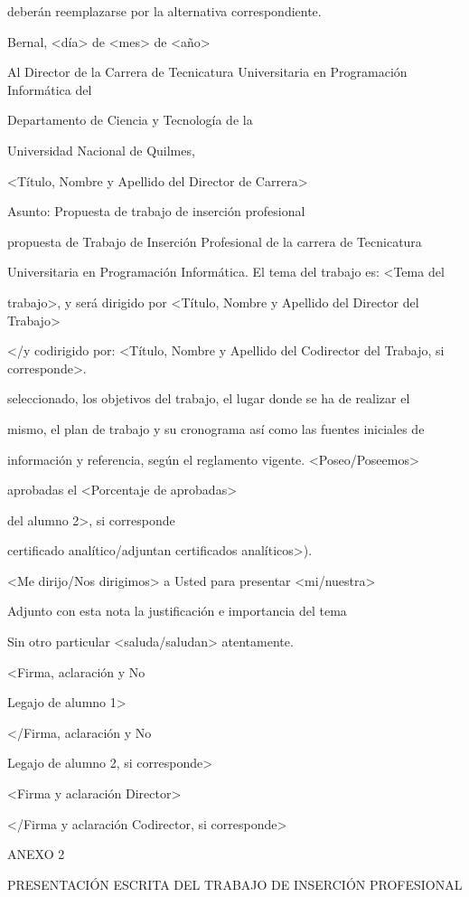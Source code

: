 \documentclass[a4paper,12pt]{article}
\begin{document}
deberán reemplazarse por la alternativa correspondiente.

Bernal, <día> de <mes> de <año>

Al Director de la Carrera de Tecnicatura Universitaria en Programación Informática del

Departamento de Ciencia y Tecnología de la

Universidad Nacional de Quilmes,

<Título, Nombre y Apellido del Director de Carrera>

Asunto: Propuesta de trabajo de inserción profesional

propuesta de Trabajo de Inserción Profesional de la carrera de Tecnicatura

Universitaria en Programación Informática. El tema del trabajo es: <Tema del

trabajo>, y será dirigido por <Título, Nombre y Apellido del Director del Trabajo> 

 </y codirigido por: <Título, Nombre y Apellido del Codirector del Trabajo, si corresponde>.

seleccionado, los objetivos del trabajo, el lugar donde se ha de realizar el

mismo, el plan de trabajo y su cronograma así como las fuentes iniciales de

información y referencia, según el reglamento vigente. <Poseo/Poseemos>

aprobadas el <Porcentaje de aprobadas>%

del alumno 2>, si corresponde%

certificado analítico/adjuntan certificados analíticos>).

<Me dirijo/Nos dirigimos> a Usted para presentar <mi/nuestra>

Adjunto con esta nota la justificación e importancia del tema

Sin otro particular <saluda/saludan> atentamente.

<Firma, aclaración y No

 Legajo de alumno 1>

</Firma, aclaración y No

 Legajo de alumno 2, si corresponde>

<Firma y aclaración Director>

</Firma y aclaración Codirector, si corresponde>

ANEXO 2

PRESENTACIÓN ESCRITA DEL TRABAJO DE INSERCIÓN PROFESIONAL
\end{document}
